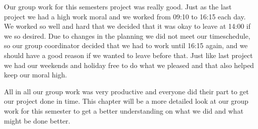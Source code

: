 Our group work for this semesters project was really good. Just as the last project we had a high work moral and we worked from 09:10 to 16:15 each day. We worked so well and hard that we decided that it was okay to leave at 14:00 if we so desired. Due to changes in the planning we did not meet our timeschedule, so our group coordinator decided that we had to work until 16:15 again, and we should have a good reason if we wanted to leave before that. 
Just like last project we had our weekends and holiday free to do what we pleased and that also helped keep our moral high.

All in all our group work was very productive and everyone did their part to get our project done in time. 
This chapter will be a more detailed look at our group work for this semester to get a better understanding on what we did and what might be done better.